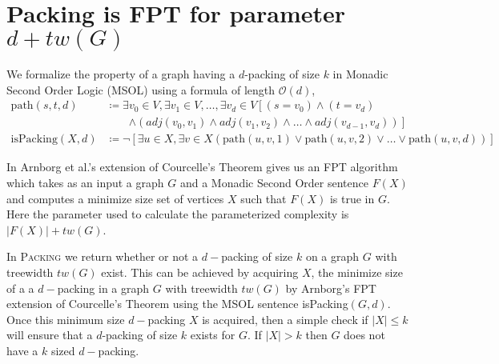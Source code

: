 \documentclass[10pt, a4paper]{article}
\theoremstyle{definition}
\newcommand{\mcO}{\mathcal{O}}
\begin{document}


\section{\sc Packing \textnormal{is FPT for parameter $d + tw(G)$}}

We formalize the property of a graph having a $d$-packing of size $k$ in Monadic Second Order Logic (MSOL) using a formula of length $\mcO(d)$,
\begin{align*}
	\mathrm{path}(s, t, d) 		&\coloneqq \exists v_0 \in V, \exists v_1 \in V, \dotsc, \exists v_d \in V
									\left [ (s=v_0) \wedge (t=v_d) \right.\nonumber \\
								&\qquad \left. \wedge (adj(v_0, v_1) \wedge adj(v_1, v_2) 
									\wedge \dots \wedge adj(v_{d-1}, v_d)) \right ] \\
	\mathrm{isPacking}(X, d)	&\coloneqq \neg \left [\exists u \in X, \exists v \in X (\mathrm{path}(u, v, 1) 
									\vee \mathrm{path}(u, v, 2) \vee \dots \vee \mathrm{path}(u, v, d) ) \right ]
\end{align*}

In Arnborg et al.'s \cite{Arnborg1991} extension of Courcelle's Theorem gives us an FPT algorithm which takes as an input a graph $G$ and a Monadic Second Order sentence $F(X)$ and computes a minimize size set of vertices $X$ such that $F(X)$ is true in $G$. Here the parameter used to calculate the parameterized complexity is $|F(X)| + tw(G)$. 

In \textsc{Packing} we return whether or not a $d-$packing of size $k$ on a graph $G$ with treewidth $tw(G)$ exist. This can be achieved by acquiring $X$, the minimize size of a a $d-$packing in a graph $G$ with treewidth $tw(G)$ by Arnborg's FPT extension of Courcelle's Theorem using the MSOL sentence isPacking$(G,d)$. Once this minimum size $d-$packing $X$ is acquired, then a simple check if $|X| \leq k$ will ensure that a $d$-packing of size $k$ exists for $G$. If $|X| > k$ then $G$ does not have a $k$ sized $d-$packing.

\end{document}
